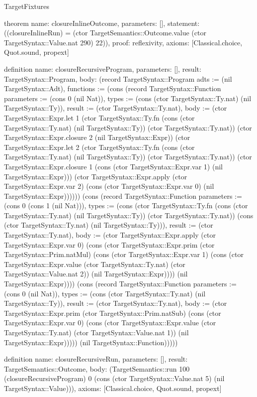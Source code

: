 \begin{lexlean}{TargetFixtures}
\begin{semanticmodule}
theorem{
  name: closureInlineOutcome,
  parameters: [],
  statement: ((closureInlineRun) = (ctor TargetSemantics::Outcome.value (ctor TargetSyntax::Value.nat 290) 22)),
  proof: reflexivity{},
  axioms: [Classical.choice, Quot.sound, propext]
}

definition{
  name: closureRecursiveProgram,
  parameters: [],
  result: TargetSyntax::Program,
  body: (record TargetSyntax::Program {adts := (nil TargetSyntax::Adt), functions := (cons (record TargetSyntax::Function {parameters := (cons 0 (nil Nat)), types := (cons (ctor TargetSyntax::Ty.nat) (nil TargetSyntax::Ty)), result := (ctor TargetSyntax::Ty.nat), body := (ctor TargetSyntax::Expr.let 1 (ctor TargetSyntax::Ty.fn (cons (ctor TargetSyntax::Ty.nat) (nil TargetSyntax::Ty)) (ctor TargetSyntax::Ty.nat)) (ctor TargetSyntax::Expr.closure 2 (nil TargetSyntax::Expr)) (ctor TargetSyntax::Expr.let 2 (ctor TargetSyntax::Ty.fn (cons (ctor TargetSyntax::Ty.nat) (nil TargetSyntax::Ty)) (ctor TargetSyntax::Ty.nat)) (ctor TargetSyntax::Expr.closure 1 (cons (ctor TargetSyntax::Expr.var 1) (nil TargetSyntax::Expr))) (ctor TargetSyntax::Expr.apply (ctor TargetSyntax::Expr.var 2) (cons (ctor TargetSyntax::Expr.var 0) (nil TargetSyntax::Expr)))))}) (cons (record TargetSyntax::Function {parameters := (cons 0 (cons 1 (nil Nat))), types := (cons (ctor TargetSyntax::Ty.fn (cons (ctor TargetSyntax::Ty.nat) (nil TargetSyntax::Ty)) (ctor TargetSyntax::Ty.nat)) (cons (ctor TargetSyntax::Ty.nat) (nil TargetSyntax::Ty))), result := (ctor TargetSyntax::Ty.nat), body := (ctor TargetSyntax::Expr.apply (ctor TargetSyntax::Expr.var 0) (cons (ctor TargetSyntax::Expr.prim (ctor TargetSyntax::Prim.natMul) (cons (ctor TargetSyntax::Expr.var 1) (cons (ctor TargetSyntax::Expr.value (ctor TargetSyntax::Ty.nat) (ctor TargetSyntax::Value.nat 2)) (nil TargetSyntax::Expr)))) (nil TargetSyntax::Expr)))}) (cons (record TargetSyntax::Function {parameters := (cons 0 (nil Nat)), types := (cons (ctor TargetSyntax::Ty.nat) (nil TargetSyntax::Ty)), result := (ctor TargetSyntax::Ty.nat), body := (ctor TargetSyntax::Expr.prim (ctor TargetSyntax::Prim.natSub) (cons (ctor TargetSyntax::Expr.var 0) (cons (ctor TargetSyntax::Expr.value (ctor TargetSyntax::Ty.nat) (ctor TargetSyntax::Value.nat 1)) (nil TargetSyntax::Expr))))}) (nil TargetSyntax::Function))))})
}

definition{
  name: closureRecursiveRun,
  parameters: [],
  result: TargetSemantics::Outcome,
  body: (TargetSemantics::run 100 (closureRecursiveProgram) 0 (cons (ctor TargetSyntax::Value.nat 5) (nil TargetSyntax::Value))),
  axioms: [Classical.choice, Quot.sound, propext]
}


\end{semanticmodule}
\end{lexlean}
